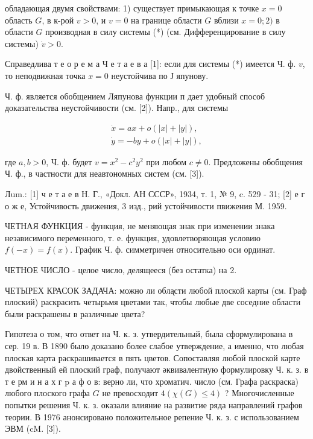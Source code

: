 \documentclass[10pt]{article}
\begin{document}
обладающая двумя свойствами: 1) существует примыкающая к точке $x=0$ область $G$, в к-рой $v>0$, и $v=0$ на границе области $G$ вблизи $x=0 ; 2)$ в области $G$ производная в силу системы (*) (см. Дифференцирование в силу системы) $\dot{v}>0$.



Справедлива т е о р е м а Ч е т а е в а [1]: если для системы (*) имеется Ч. ф. $v$, то неподвижная точка $x=0$ неустойчива по Ј япунову.



Ч. ф. является обобщением Ляпунова функции п дает удобный способ доказательства неустойчивости (см. [2]). Напр., для системы



\[

\begin{gathered}

\dot{x}=a x+o(|x|+|y|), \\

\dot{y}=-b y+o(|x|+|y|),

\end{gathered}

\]



где $a, b>0$, Ч. ф. будет $v=x^{2}-c^{2} y^{2}$ при любом $c \neq 0$. Предложены обобщения Ч. ф., в частности для неавтономных систем (см. [3]).



Лum.: [1] ч е т а е в Н. Г., «Докл. АН СССР», 1934, т. 1, № 9, c. 529 - 31; [2] е г о ж е, Устойчивость движения, 3 изд., рий устойчивости пвижения М. 1959.



ЧЕТНАЯ ФУНКЦИЯ - функция, не меняющая знак при изменении знака независимого переменного, т. е. функция, удовлетворяющая условию $f(-x)=f(x)$. График Ч. ф. симметричен относительно оси ординат.



ЧЕТНОЕ ЧИСЛО - целое число, делящееся (без остатка) на 2.



ЧЕТЫРЕХ КРАСОК ЗАДАЧА: можно ли обла̨сти любой плоской карты (см. Граф плоский) раскрасить четырьмя цветами так, чтобы любые две соседние области были раскрашены в различные цвета?



Гипотеза о том, что ответ на Ч. к. з. утвердительный, была сформулирована в сер. 19 в. В 1890 было доказано более слабое утверждение, а именно, что любая плоская карта раскрашивается в пять цветов. Сопоставляя любой плоской карте двойственный ей плоский граф, получают әквивалентную формулировку Ч. к. з. в т е рм и н а х г p а ф о в: верно ли, что хроматич. число (см. Графа раскраска) любого плоского графа $G$ не превосходит $4(\chi(G) \leqslant 4)$ ? Многочисленные попытки решения Ч. к. з. оказали влияние на развитие ряда направлений графов теории. В 1976 анонсировано положительное репение Ч. к. з. с использованием ЭВМ (cM. [3]).
\end{document}
